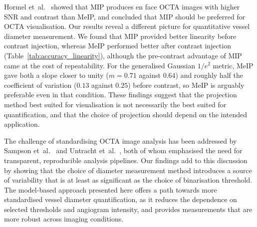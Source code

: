 
Hormel et~al.~\cite{hormelMaximumValueProjection2018} showed that MIP produces en face OCTA images with higher SNR and contrast than MeIP, and concluded that MIP should be preferred for OCTA visualisation. Our results reveal a different picture for quantitative vessel diameter measurement. We found that MIP provided better linearity before contrast injection, whereas MeIP performed better after contrast injection (Table~\ref{tab:accuracy_linearity}), although the pre-contrast advantage of MIP came at the cost of repeatability. For the generalised Gaussian $1/e^2$ metric, MeIP gave both a slope closer to unity ($m = 0.71$ against $0.64$) and roughly half the coefficient of variation ($0.13$ against $0.25$) before contrast, so MeIP is arguably preferable even in that condition. These findings suggest that the projection method best suited for visualisation is not necessarily the best suited for quantification, and that the choice of projection should depend on the intended application.

The challenge of standardising OCTA image analysis has been addressed by Sampson et~al.~\cite{sampsonTowardsStandardizingRetinal2022} and Untracht et~al.~\cite{untrachtTowardsStandardisingRetinal2024}, both of whom emphasised the need for transparent, reproducible analysis pipelines. Our findings add to this discussion by showing that the choice of diameter measurement method introduces a source of variability that is at least as significant as the choice of binarisation threshold. The model-based approach presented here offers a path towards more standardised vessel diameter quantification, as it reduces the dependence on selected thresholds and angiogram intensity, and provides measurements that are more robust across imaging conditions.

